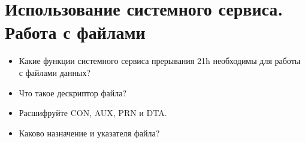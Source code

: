 \chapter{Использование системного сервиса. Работа с файлами}
\begin{itemize}
\item Какие функции системного сервиса прерывания 21h необходимы для работы с
файлами данных?
\item Что такое дескриптор файла?
\item Расшифруйте CON, AUX, PRN и DTA.
\item Каково назначение и указателя файла?
\end{itemize}
\endinput
